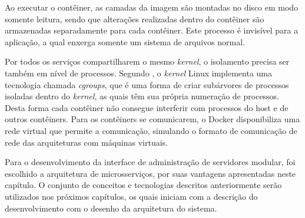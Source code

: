 Ao executar o contêiner, as camadas da imagem são montadas no disco em modo
somente leitura, sendo que alterações realizadas dentro do contêiner são
armazenadas separadamente para cada contêiner. Este processo é invisível para
a aplicação, a qual enxerga somente um sistema de arquivos normal.

Por todos os serviços compartilharem o mesmo \emph{kernel}, o isolamento
precisa ser também em nível de processos. Segundo ,
o \emph{kernel} Linux implementa uma tecnologia chamada \emph{cgroups},
que é uma forma de criar subárvores de processos isoladas dentro
do \emph{kernel}, as quais têm sua própria numeração de processos. Desta
forma cada contêiner não consegue interferir com processos do host e de
outros contêiners. Para os contêiners se comunicarem, o Docker
disponibiliza uma rede virtual que permite a comunicação, simulando o
formato de comunicação de rede das arquiteturas com máquinas virtuais.

Para o desenvolvimento da interface de administração de servidores modular,
foi escolhido a arquitetura de microsserviços, por suas vantagens apresentadas
neste capítulo. O conjunto de conceitos e tecnologias descritos anteriormente
serão utilizados nos próximos capítulos, os quais iniciam com a descrição do
desenvolvimento com o desenho da arquitetura do sistema.
